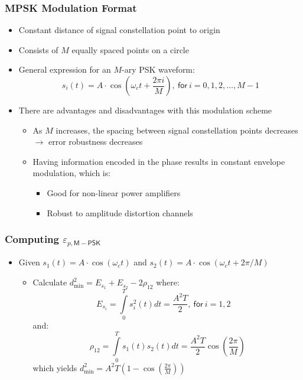 \documentclass[10pt]{beamer}
\begin{document}
\frame
{
  \frametitle{MPSK Modulation Format}
  
  \begin{itemize}
    \item Constant distance of signal constellation point to origin
    \item Consists of $M$ equally spaced points on a circle
    \item General expression for an $M$-ary PSK waveform:
    \begin{equation}
        s_i(t)=A\cdot\cos\left(\omega_ct+\frac{2\pi{i}}{M}\right),~\mathsf{for}~i=0,1,2,\ldots,M-1
    \end{equation}
    \item There are advantages and disadvantages with this modulation scheme
    \begin{itemize}
        \item As $M$ increases, the spacing between signal constellation points decreases $\rightarrow$ error robustness decreases
        \item Having information encoded in the phase results in constant envelope modulation, which is:
        \begin{itemize}
            \item Good for non-linear power amplifiers
            \item Robust to amplitude distortion channels
        \end{itemize}
    \end{itemize}
  \end{itemize}
  
}
\frame
{
  \frametitle{Computing $\varepsilon_{p,\mathsf{M-PSK}}$}
  
  \begin{itemize}
    \item Given $s_1(t)=A\cdot\cos(\omega_ct)$ and $s_2(t)=A\cdot\cos(\omega_ct+2\pi/M)$
    \begin{itemize}
        \item Calculate $d_{\min}^2=E_{s_1}+E_{s_2}-2\rho_{12}$ where:
        \begin{equation}
            E_{s_i}=\int\limits_0^Ts_i^2(t)dt=\frac{A^2T}{2},~\mathsf{for}~i=1,2\quad
        \end{equation}
        and:
        \begin{equation}
            \rho_{12}=\int\limits_0^Ts_1(t)s_2(t)dt=\frac{A^2T}{2}\cos\left(\frac{2\pi}{M}\right)
        \end{equation}
        which yields $d_{\min}^2=A^2T(1-\cos(\frac{2\pi}{M}))$
    \end{itemize}
  \end{itemize}
  
  
}
\end{document}
